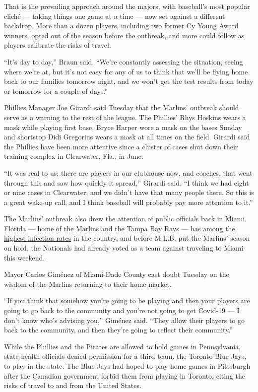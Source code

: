 That is the prevailing approach around the majors, with baseball's most
popular cliché --- taking things one game at a time --- now set against
a different backdrop. More than a dozen players, including two former Cy
Young Award winners, opted out of the season before the outbreak, and
more could follow as players calibrate the risks of travel.

``It's day to day,'' Braun said. ``We're constantly assessing the
situation, seeing where we're at, but it's not easy for any of us to
think that we'll be flying home back to our families tomorrow night, and
we won't get the test results from today or tomorrow for a couple of
days.''

Phillies Manager Joe Girardi said Tuesday that the Marlins' outbreak
should serve as a warning to the rest of the league. The Phillies' Rhys
Hoskins wears a mask while playing first base, Bryce Harper wore a mask
on the bases Sunday and shortstop Didi Gregorius wears a mask at all
times on the field. Girardi said the Phillies have been more attentive
since a cluster of cases shut down their training complex in Clearwater,
Fla., in June.

``It was real to us; there are players in our clubhouse now, and
coaches, that went through this and saw how quickly it spread,'' Girardi
said. ``I think we had eight or nine cases in Clearwater, and we didn't
have that many people there. So this is a great wake-up call, and I
think baseball will probably pay more attention to it.''

The Marlins' outbreak also drew the attention of public officials back
in Miami. Florida --- home of the Marlins and the Tampa Bay Rays ---
\href{https://www.nytimes3xbfgragh.onion/interactive/2020/us/florida-coronavirus-cases.html}{has
among the highest infection rates} in the country, and before M.L.B. put
the Marlins' season on hold, the Nationals had already voted as a team
against traveling to Miami this weekend.

Mayor Carlos Giménez of Miami-Dade County cast doubt Tuesday on the
wisdom of the Marlins returning to their home market.

``If you think that somehow you're going to be playing and then your
players are going to go back to the community and you're not going to
get Covid-19 --- I don't know who's advising you,'' Giménez said. ``They
allow their players to go back to the community, and then they're going
to reflect their community.''

While the Phillies and the Pirates are allowed to hold games in
Pennsylvania, state health officials denied permission for a third team,
the Toronto Blue Jays, to play in the state. The Blue Jays had hoped to
play home games in Pittsburgh after the Canadian government forbid them
from playing in Toronto, citing the risks of travel to and from the
United States.

